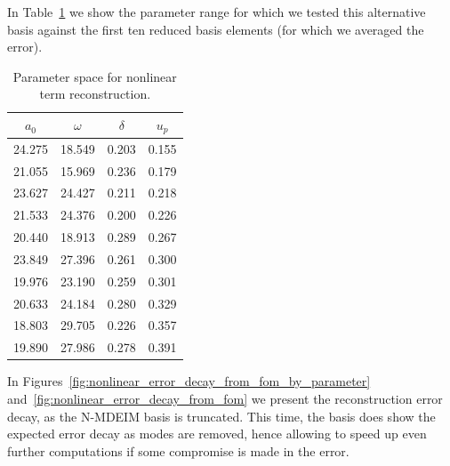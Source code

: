 \documentclass[../../thesis.tex]{subfiles}
\begin{document}
In Table~\ref{tab:mdeim_certification} we show the parameter range for which
we tested this alternative basis against the first ten reduced basis elements
(for which we averaged the error).
\begin{table}[h]
    \centering
    \caption{Parameter space for nonlinear term reconstruction.}
    \label{tab:mdeim_certification}
    \begin{tabular}{cccc}
        \toprule
        $a_0$  & $\omega$ & $\delta$ & $u_p$ \\
        \midrule
        24.275 &  18.549  & 0.203 &  0.155 \\
        21.055 &  15.969  & 0.236 &  0.179 \\
        23.627 &  24.427  & 0.211 &  0.218 \\
        21.533 &  24.376  & 0.200 &  0.226 \\
        20.440 &  18.913  & 0.289 &  0.267 \\
        23.849 &  27.396  & 0.261 &  0.300 \\
        19.976 &  23.190  & 0.259 &  0.301 \\
        20.633 &  24.184  & 0.280 &  0.329 \\
        18.803 &  29.705  & 0.226 &  0.357 \\
        19.890 &  27.986  & 0.278 &  0.391 \\
        \bottomrule
\end{tabular}
\end{table}

In Figures~\ref{fig:nonlinear_error_decay_from_fom_by_parameter} and~\ref{fig:nonlinear_error_decay_from_fom}
we present the reconstruction error decay, as the N-MDEIM basis is truncated.
This time, the basis does show the expected error decay as modes are removed,
hence allowing to speed up even further computations if some compromise is made in the error.
\end{document}
